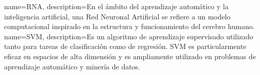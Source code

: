 {
	name=RNA,
	description={En el ámbito del aprendizaje automático y la inteligencia artificial, una Red Neuronal Artificial se refiere a un modelo computacional inspirado en la estructura y funcionamiento del cerebro humano. } 
}
{
	name=SVM,
	description={Es un algoritmo de aprendizaje supervisado utilizado tanto para tareas de clasificación como de regresión. SVM es particularmente eficaz en espacios de alta dimensión y es ampliamente utilizado en problemas de aprendizaje automático y minería de datos.} 
}
